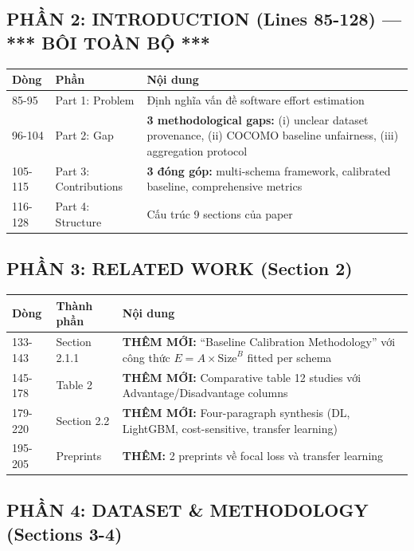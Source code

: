 \documentclass[11pt,a4paper]{article}
\begin{document}
\subsection*{PHẦN 2: INTRODUCTION (Lines 85-128) --- *** BÔI TOÀN BỘ ***}

\begin{longtable}{p{}p{}p{}}
\toprule
\textbf{Dòng} & \textbf{Phần} & \textbf{Nội dung} \\
\midrule
85-95 & Part 1: Problem & Định nghĩa vấn đề software effort estimation \\
96-104 & Part 2: Gap & \textbf{3 methodological gaps:} (i) unclear dataset provenance, (ii) COCOMO baseline unfairness, (iii) aggregation protocol \\
105-115 & Part 3: Contributions & \textbf{3 đóng góp:} multi-schema framework, calibrated baseline, comprehensive metrics \\
116-128 & Part 4: Structure & Cấu trúc 9 sections của paper \\
\bottomrule
\end{longtable}

\subsection*{PHẦN 3: RELATED WORK (Section 2)}

\begin{longtable}{p{}p{}p{}}
\toprule
\textbf{Dòng} & \textbf{Thành phần} & \textbf{Nội dung} \\
\midrule
133-143 & Section 2.1.1 & \textbf{THÊM MỚI:} ``Baseline Calibration Methodology'' với công thức $E = A \times \text{Size}^B$ fitted per schema \\
145-178 & Table 2 & \textbf{THÊM MỚI:} Comparative table 12 studies với Advantage/Disadvantage columns \\
179-220 & Section 2.2 & \textbf{THÊM MỚI:} Four-paragraph synthesis (DL, LightGBM, cost-sensitive, transfer learning) \\
195-205 & Preprints & \textbf{THÊM:} 2 preprints về focal loss và transfer learning \\
\bottomrule
\end{longtable}

\subsection*{PHẦN 4: DATASET \& METHODOLOGY (Sections 3-4)}
\end{document}
